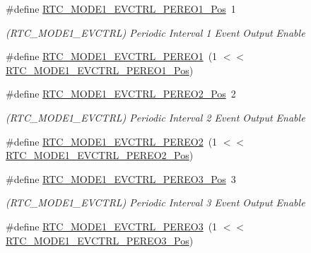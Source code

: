 \begin{DoxyCompactItemize}
\#define \mbox{\hyperlink{group___s_a_m_d21___r_t_c_gab2e6ec0aaf84f8431e011d6300a09526}{R\+T\+C\+\_\+\+M\+O\+D\+E1\+\_\+\+E\+V\+C\+T\+R\+L\+\_\+\+P\+E\+R\+E\+O1\+\_\+\+Pos}}~1
\begin{DoxyCompactList}\small\item\em (R\+T\+C\+\_\+\+M\+O\+D\+E1\+\_\+\+E\+V\+C\+T\+RL) Periodic Interval 1 Event Output Enable \end{DoxyCompactList}\item 
\#define \mbox{\hyperlink{group___s_a_m_d21___r_t_c_ga35e192eb8fbbac9549c175cbc5cae062}{R\+T\+C\+\_\+\+M\+O\+D\+E1\+\_\+\+E\+V\+C\+T\+R\+L\+\_\+\+P\+E\+R\+E\+O1}}~(1 $<$$<$ \mbox{\hyperlink{group___s_a_m_d21___r_t_c_gab2e6ec0aaf84f8431e011d6300a09526}{R\+T\+C\+\_\+\+M\+O\+D\+E1\+\_\+\+E\+V\+C\+T\+R\+L\+\_\+\+P\+E\+R\+E\+O1\+\_\+\+Pos}})
\item 
\#define \mbox{\hyperlink{group___s_a_m_d21___r_t_c_gae7793a997074013d63e3e6557be034c2}{R\+T\+C\+\_\+\+M\+O\+D\+E1\+\_\+\+E\+V\+C\+T\+R\+L\+\_\+\+P\+E\+R\+E\+O2\+\_\+\+Pos}}~2
\begin{DoxyCompactList}\small\item\em (R\+T\+C\+\_\+\+M\+O\+D\+E1\+\_\+\+E\+V\+C\+T\+RL) Periodic Interval 2 Event Output Enable \end{DoxyCompactList}\item 
\#define \mbox{\hyperlink{group___s_a_m_d21___r_t_c_gaecc260e24b8ec18df7f892f78fe2b0e1}{R\+T\+C\+\_\+\+M\+O\+D\+E1\+\_\+\+E\+V\+C\+T\+R\+L\+\_\+\+P\+E\+R\+E\+O2}}~(1 $<$$<$ \mbox{\hyperlink{group___s_a_m_d21___r_t_c_gae7793a997074013d63e3e6557be034c2}{R\+T\+C\+\_\+\+M\+O\+D\+E1\+\_\+\+E\+V\+C\+T\+R\+L\+\_\+\+P\+E\+R\+E\+O2\+\_\+\+Pos}})
\item 
\#define \mbox{\hyperlink{group___s_a_m_d21___r_t_c_ga659202b68a5488009b36a511fd3758e3}{R\+T\+C\+\_\+\+M\+O\+D\+E1\+\_\+\+E\+V\+C\+T\+R\+L\+\_\+\+P\+E\+R\+E\+O3\+\_\+\+Pos}}~3
\begin{DoxyCompactList}\small\item\em (R\+T\+C\+\_\+\+M\+O\+D\+E1\+\_\+\+E\+V\+C\+T\+RL) Periodic Interval 3 Event Output Enable \end{DoxyCompactList}\item 
\#define \mbox{\hyperlink{group___s_a_m_d21___r_t_c_ga42108d2f3b22d4571b7a1e66b9098e1c}{R\+T\+C\+\_\+\+M\+O\+D\+E1\+\_\+\+E\+V\+C\+T\+R\+L\+\_\+\+P\+E\+R\+E\+O3}}~(1 $<$$<$ \mbox{\hyperlink{group___s_a_m_d21___r_t_c_ga659202b68a5488009b36a511fd3758e3}{R\+T\+C\+\_\+\+M\+O\+D\+E1\+\_\+\+E\+V\+C\+T\+R\+L\+\_\+\+P\+E\+R\+E\+O3\+\_\+\+Pos}})
\item 
$$
\end{DoxyCompactItemize}
